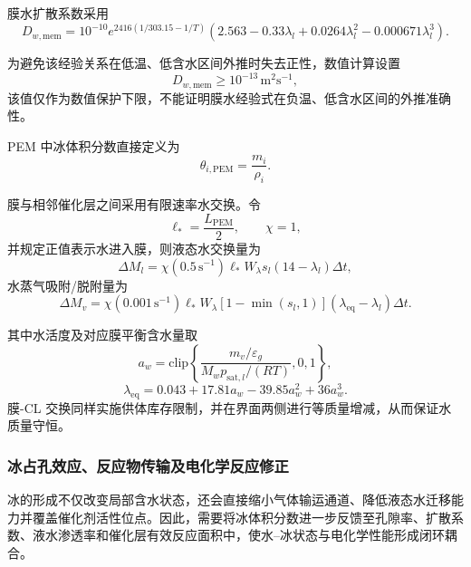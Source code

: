 \documentclass[bwprint]{gmcmthesis}
\numberwithin{equation}{section}
\numberwithin{figure}{section}
\begin{document}
\begin{itemize}
 膜水扩散系数采用
\begin{equation}
D_{w,\text{mem}} = 10^{-10} e^{2416(1/303.15 - 1/T)} \left( 2.563 - 0.33\lambda_l + 0.0264\lambda_l^2 - 0.000671\lambda_l^3 \right). \label{eq:src:4-38}
\end{equation}

{ 为避免该经验关系在低温、低含水区间外推时失去正性，数值计算设置
\[
D_{w,\text{mem}} \ge 10^{-13} \, \text{m}^2\text{s}^{-1},
\]
 该值仅作为数值保护下限，不能证明膜水经验式在负温、低含水区间的外推准确性。

 PEM 中冰体积分数直接定义为
\begin{equation}
\theta_{i,\text{PEM}} = \frac{m_i}{\rho_i}. \label{eq:src:4-39}
\end{equation}

 膜与相邻催化层之间采用有限速率水交换。令
\[
\ell_* = \frac{L_{\text{PEM}}}{2}, \qquad \chi = 1,
\]
 并规定正值表示水进入膜，则液态水交换量为
\begin{equation}
\Delta M_l = \chi(0.5 \, \text{s}^{-1})\ell_* W_\lambda s_l(14 - \lambda_l)\Delta t,
\label{eq:src:4-40}
\end{equation}
 水蒸气吸附/脱附量为
\begin{equation}
\Delta M_v = \chi(0.001 \, \text{s}^{-1})\ell_* W_\lambda [1 - \min(s_l, 1)](\lambda_{\text{eq}} - \lambda_l)\Delta t.
\label{eq:src:4-41}
\end{equation}

 其中水活度及对应膜平衡含水量取
\begin{equation}
a_w = \text{clip}\left\{ \frac{m_v / \varepsilon_g}{M_w p_{\text{sat},l} / (RT)}, 0, 1 \right\},
\label{eq:src:4-42}
\end{equation}
\begin{equation}
\lambda_{\text{eq}} = 0.043 + 17.81 a_w - 39.85 a_w^2 + 36 a_w^3.
\label{eq:src:4-43}
\end{equation}
 膜-CL 交换同样实施供体库存限制，并在界面两侧进行等质量增减，从而保证水质量守恒。}


\end{itemize}

\subsubsection{冰占孔效应、反应物传输及电化学反应修正}
冰的形成不仅改变局部含水状态，还会直接缩小气体输运通道、降低液态水迁移能力并覆盖催化剂活性位点。因此，需要将冰体积分数进一步反馈至孔隙率、扩散系数、液水渗透率和催化层有效反应面积中，使水–冰状态与电化学性能形成闭环耦合。
\end{document}
